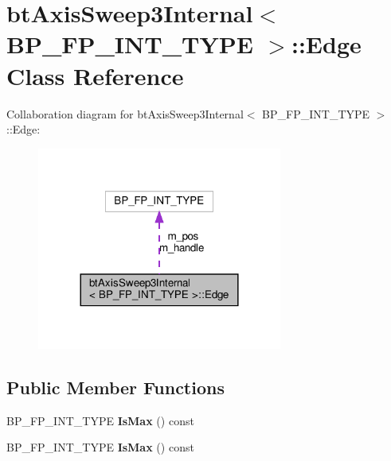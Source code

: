 \hypertarget{classbtAxisSweep3Internal_1_1Edge}{}\section{bt\+Axis\+Sweep3\+Internal$<$ B\+P\+\_\+\+F\+P\+\_\+\+I\+N\+T\+\_\+\+T\+Y\+PE $>$\+:\+:Edge Class Reference}
\label{classbtAxisSweep3Internal_1_1Edge}


Collaboration diagram for bt\+Axis\+Sweep3\+Internal$<$ B\+P\+\_\+\+F\+P\+\_\+\+I\+N\+T\+\_\+\+T\+Y\+PE $>$\+:\+:Edge\+:
\nopagebreak
\begin{figure}[H]
\begin{center}
\leavevmode
\includegraphics[width=228pt]{classbtAxisSweep3Internal_1_1Edge__coll__graph}
\end{center}
\end{figure}
\subsection*{Public Member Functions}
\begin{DoxyCompactItemize}
\item 
\mbox{\label{classbtAxisSweep3Internal_1_1Edge_a95258f2743e5b5ff87dd54b54145b9c0}} 
B\+P\+\_\+\+F\+P\+\_\+\+I\+N\+T\+\_\+\+T\+Y\+PE {\bfseries Is\+Max} () const
\item 
\mbox{\label{classbtAxisSweep3Internal_1_1Edge_a95258f2743e5b5ff87dd54b54145b9c0}} 
B\+P\+\_\+\+F\+P\+\_\+\+I\+N\+T\+\_\+\+T\+Y\+PE {\bfseries Is\+Max} () const
\end{DoxyCompactItemize}
